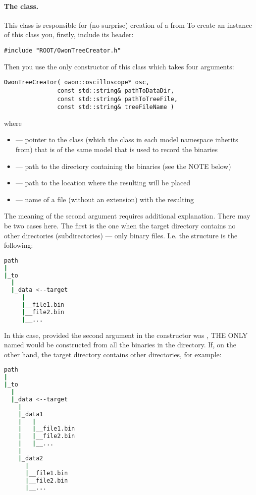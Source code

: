 \paragraph*{The  class.} This class is responsible for (no surprise) 
creation of a  from 
To create an instance of this class you, firstly, include its header:
\begin{lstlisting}
#include "ROOT/OwonTreeCreator.h"
\end{lstlisting}
Then you use the only constructor of this class which takes four arguments:
\begin{lstlisting}
OwonTreeCreator( owon::oscilloscope* osc,
               const std::string& pathToDataDir,
               const std::string& pathToTreeFile,
               const std::string& treeFileName )
\end{lstlisting}
where
    \begin{itemize}
        \item[]  --- pointer to the  class (which the  class in each model namespace inherits from) that is of the same model that is
            used to record the binaries
        \item[]  --- path to the directory containing the binaries (see the NOTE below)
        \item[]  --- path to the location where the resulting  will be placed
        \item[]  --- name of a  file (without an extension) with the resulting 
    \end{itemize}
The meaning of the second argument requires additional explanation. There may be two
cases here. The first is the one when the target directory contains no other directories
(subdirectories) --- only binary files. I.e. the structure is the following:
\begin{lstlisting}[language=bash]
path
|
|_to
  |
  |_data <--target
     |
     |__file1.bin
     |__file2.bin
     |__...
\end{lstlisting}
In this case, provided the second argument in the  constructor
was , THE ONLY  named  would be constructed
from all the binaries in the  directory. If, on the other hand, the target
directory contains other directories, for example:
\begin{lstlisting}[language=bash]
path
|
|_to
  |
  |_data <--target
    |
    |_data1
    |   | 
    |   |__file1.bin
    |   |__file2.bin
    |   |__...
    |
    |_data2
      |
      |__file1.bin
      |__file2.bin
      |__...
\end{lstlisting}
